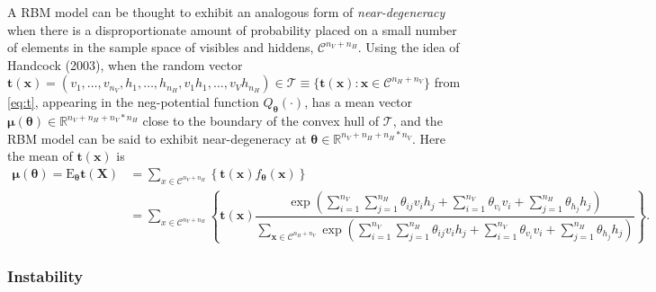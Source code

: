 \documentclass[AMS,STIX1COL]{WileyNJD-v2}
\newcommand{\nv}{{n_{\scriptscriptstyle V}}}
\newcommand{\nh}{{n_{\scriptscriptstyle H}}}
\begin{document}
A RBM model can be thought to exhibit an analogous form of
\emph{near-degeneracy} when there is a disproportionate amount of
probability placed on a small number of elements in the sample space of
visibles and hiddens, \(\mathcal{C}^{\nv + \nh}\). Using the idea of
Handcock (2003), when the random vector
\(\boldsymbol t(\boldsymbol x) = (v_1, \dots, v_\nv, h_1, \dots, h_\nh, v_1 h_1, \dots, v_V h_\nh ) \in \mathcal{T} \equiv \{\boldsymbol t(\boldsymbol x): \boldsymbol x \in \mathcal{C}^{\nh + \nv} \}\)
from \eqref{eq:t}, appearing in the neg-potential function
\(Q_{\boldsymbol \theta}(\cdot)\), has a mean vector
\(\boldsymbol \mu(\boldsymbol \theta) \in \mathbb{R}^{\nv + \nh + \nv * \nh}\)
close to the boundary of the convex hull of \(\mathcal{T}\), and the RBM
model can be said to exhibit near-degeneracy at
\(\boldsymbol \theta \in \mathbb{R}^{\nv + \nh + \nh*\nv}\). Here the
mean of \(\boldsymbol t(\boldsymbol x)\) is \begin{align*}
\boldsymbol \mu(\boldsymbol \theta) = \text{E}_{\boldsymbol \theta} \boldsymbol t(\boldsymbol X)  &= \sum\limits_{x \in \mathcal{C}^{\nv + \nh}} \left\{ \boldsymbol t(\boldsymbol x) f_{\boldsymbol \theta} (\boldsymbol x) \right\} \\
&= \sum\limits_{x \in \mathcal{C}^{\nv + \nh}} \left\{ \boldsymbol t(\boldsymbol x)\dfrac{\exp\left(\sum\limits_{i = 1}^\nv \sum\limits_{j=1}^\nh \theta_{ij} v_i h_j + \sum\limits_{i = 1}^\nv\theta_{v_i} v_i + \sum\limits_{j = 1}^\nh\theta_{h_j} h_j\right)}{\sum\limits_{\boldsymbol x \in \mathcal{C}^{\nh + \nv}}\exp\left(\sum\limits_{i = 1}^\nv \sum\limits_{j=1}^\nh \theta_{ij} v_i h_j + \sum\limits_{i = 1}^\nv\theta_{v_i} v_i + \sum\limits_{j = 1}^\nh\theta_{h_j} h_j\right)}\right\}.
\end{align*}

\hypertarget{instability}{%
\subsubsection{Instability}\label{instability}}
\end{document}
